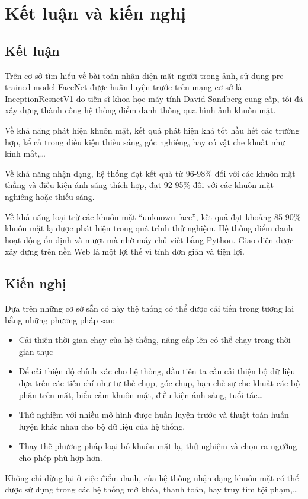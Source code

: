 \chapter{Kết luận và kiến nghị}
\label{cha:chap4}

\section{Kết luận}
Trên cơ sở tìm hiểu về bài toán nhận diện mặt người trong ảnh, sử dụng pre-trained
model FaceNet được huấn luyện trước trên mạng cơ sở là InceptionResnetV1 do
tiến sĩ khoa học máy tính David Sandberg cung cấp, tôi đã xây dựng thành công hệ
thống điểm danh thông qua hình ảnh khuôn mặt.

Về khả năng phát hiện khuôn mặt, kết quả phát hiện khá tốt hầu hết các trường hợp,
kể cả trong điều kiện thiếu sáng, góc nghiêng, hay có vật che khuất như kính mắt,…

Về khả năng nhận dạng, hệ thống đạt kết quả từ 96-98\% đối với các khuôn mặt thẳng
và điều kiện ánh sáng thích hợp, đạt 92-95\% đối với các khuôn mặt nghiêng hoặc
thiếu sáng.

Về khả năng loại trừ các khuôn mặt “unknown face”, kết quả đạt khoảng 85-90\% khuôn mặt lạ
được phát hiện trong quá trình thử nghiệm.
Hệ thống điểm danh hoạt động ổn định và mượt mà nhờ máy chủ viết bằng Python.
Giao diện được xây dựng trên nền Web là một lợi thế vì tính đơn giản và tiện lợi.

\section{Kiến nghị}

Dựa trên những cơ sở sẵn có này thệ thống có thể được cải tiến trong
tương lai bằng những phương pháp sau:
\begin{itemize}
    \item Cải thiện thời gian chạy của hệ thống, nâng cấp lên có thể chạy trong thời gian thực
    \item Để cải thiện độ chính xác cho hệ thống, đầu tiên ta cần cải thiện bộ dữ liệu dựa trên các tiêu chí như tư thế chụp, góc chụp, hạn chế sự che khuất các bộ phận trên mặt, biểu cảm khuôn mặt, điều kiện ánh sáng, tuổi tác…
    \item Thử nghiệm với nhiều mô hình được huấn luyện trước và thuật toán huấn luyện khác nhau cho bộ dữ liệu của hệ thống.
    \item Thay thế phương pháp loại bỏ khuôn mặt lạ, thử nghiệm và chọn ra ngưỡng cho phép phù hợp hơn.
\end{itemize}

Không chỉ dừng lại ở việc điểm danh, của hệ thống nhận dạng khuôn mặt có thể được sử dụng trong các 
hệ thống mở khóa, thanh toán, hay truy tìm tội phạm,…



